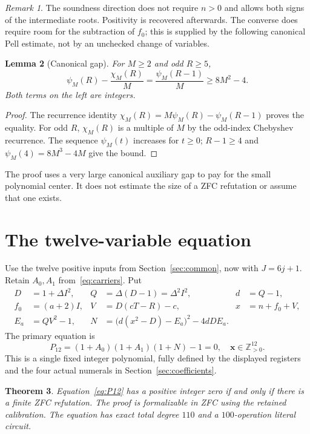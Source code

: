 \documentclass[11pt]{article}
\newcommand{\Zp}{\mathbb Z_{>0}}
\newtheorem{theorem}{Theorem}[section]
\newtheorem{lemma}[theorem]{Lemma}
\theoremstyle{remark}
\newtheorem{remark}[theorem]{Remark}
\begin{document}
\begin{remark}
The soundness direction does not require $n>0$ and allows both signs of
the intermediate roots. Positivity is recovered afterwards. The converse
does require room for the subtraction of $f_0$; this is supplied by the
following canonical Pell estimate, not by an unchecked change of variables.
\end{remark}

\begin{lemma}[Canonical gap]
For $M\ge2$ and odd $R\ge5$,
\[
 \psi_M(R)-\frac{\chi_M(R)}M
   =\frac{\psi_M(R-1)}M\ge8M^2-4.
\]
Both terms on the left are integers.
\end{lemma}
\begin{proof}
The recurrence identity $\chi_M(R)=M\psi_M(R)-\psi_M(R-1)$ proves the
equality. For odd $R$, $\chi_M(R)$ is a multiple of $M$ by the odd-index
Chebyshev recurrence. The sequence $\psi_M(t)$ increases for $t\ge0$;
$R-1\ge4$ and $\psi_M(4)=8M^3-4M$ give the bound.
\end{proof}

The proof uses a very large canonical auxiliary gap to pay for the small
polynomial center. It does not estimate the size of a ZFC refutation or
assume that one exists.

\section{The twelve-variable equation}
\label{sec:twelve}

Use the twelve positive inputs from Section~\ref{sec:common}, now with
$J=6j+1$. Retain $A_0,A_1$ from~\eqref{eq:carriers}. Put
\begin{align}
 D&=1+\Delta I^2,& Q&=\Delta(D-1)=\Delta^2I^2,&d&=Q-1,\\
 f_0&=(a+2)I,&V&=D(cT-R)-c,&x&=n+f_0+V,\\
 E_a&=QV^2-1,&N&=\bigl(d(x^2-D)-E_a\bigr)^2-4dDE_a.
\end{align}
The primary equation is
\begin{equation}
 \boxed{\;P_{12}=(1+A_0)(1+A_1)(1+N)-1=0,
                  \quad\mathbf x\in\Zp^{12}.\;}
 \label{eq:P12}
\end{equation}
This is a single fixed integer polynomial, fully defined by the displayed
registers and the four actual numerals in Section~\ref{sec:coefficients}.

\begin{theorem}
Equation~\eqref{eq:P12} has a positive integer zero if and only if there is
a finite ZFC refutation. The proof is formalizable in ZFC using the retained
calibration. The equation has exact total degree $110$ and a $100$-operation
literal circuit.
\end{theorem}
\end{document}
